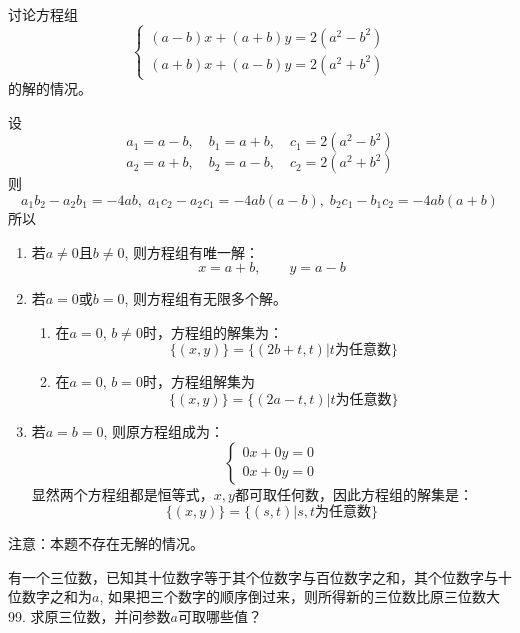 \begin{example}
讨论方程组
\[\begin{cases}
    (a-b) x+ (a+b) y=2 (a^2-b^2)\\
    (a+b) x+ (a-b)y=2 (a^2+b^2)
\end{cases}\]
的解的情况。    
\end{example}

\begin{solution}
设$$a_1=a-b,\quad b_1 =a+b,\quad c_1=2 (a^2-b^2)$$
$$a_2=a+b,\quad b_2 =a-b,\quad c_2=2 (a^2+b^2)$$
则$$a_1b_2-a_2b_1=-4ab,\; a_1c_2-a_2c_1=-4ab(a-b),\; b_2c_1-b_1c_2=-4ab(a+b)$$所以
\begin{enumerate}
\item 若$a\ne 0$且$b\ne 0$, 则方程组有唯一解：
\[x=a+b,\qquad y=a-b\]
\item 若$a=0$或$b=0$, 则方程组有无限多个解。
\begin{enumerate}
    \item 在$a=0$, $b\ne 0$时，方程组的解集为：
\[\{(x,y)\}=\{(2b+t,t)|\text{$t$为任意数}\}\]
\item 在$a=0$, $b=0$时，方程组解集为
\[\{(x,y)\}=\{(2a-t,t)|\text{$t$为任意数}\}\]
\end{enumerate}

\item 若$a=b=0$, 则原方程组成为：
\[\begin{cases}
    0x+0y=0 \\ 0x+0y=0 
\end{cases}\]
显然两个方程组都是恒等式，$x,y$都可取任何数，因此方程组的解集是：
\[\{(x,y)\} =\{ (s,t)|\text{$s,t$为任意数}\}\]
\end{enumerate}
注意：本题不存在无解的情况。
\end{solution}

\begin{example}
有一个三位数，已知其十位数字等于其个位数字与百位数字之和，其个位数字与十位数字之和为$a$, 如果把三个数字的顺序倒过来，则所得新的三位数比原三位数大99. 求原三位数，并问参数$a$可取哪些值？
\end{example}


